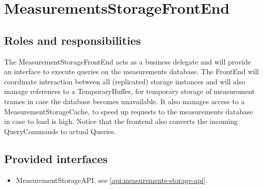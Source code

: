 \section{MeasurementsStorageFrontEnd}
\label{element:measurements-storage-front-end}

\subsection{Roles and responsibilities}

\npar The MeasurementStorageFrontEnd acts as a business delegate and will
provide an interface to execute queries on the measurements database. The
FrontEnd will coordinate interaction between all (replicated) storage instances
and will also manage references to a TemporaryBuffer, for temporary storage of
measurement trames in case the database becomes unavailable. It also manages
access to a MeasurementStorageCache, to speed up requests to the measurements
database in case to load is high. Notice that the frontend also converts the
incoming QueryCommands to actual Queries.

\subsection{Provided interfaces}

\begin{itemize}
  \item MeasurementStorageAPI, see \ref{api:measurements-storage-api}.
\end{itemize}
